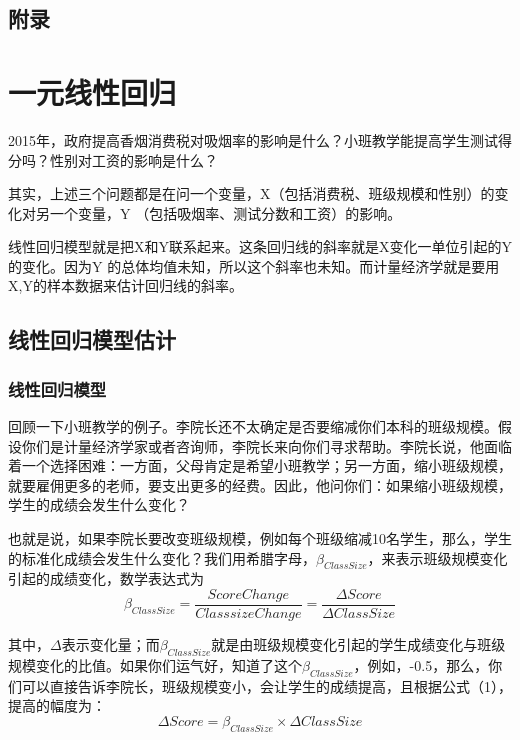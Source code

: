 \documentclass[cn,12pt,math=newtx,citestyle=gb7714-2015,bibstyle=gb7714-2015]{elegantbook}
\begin{document}
	
	
	\section{附录}
	
	
	
	\chapter{一元线性回归}
	
	2015年，政府提高香烟消费税对吸烟率的影响是什么？小班教学能提高学生测试得分吗？性别对工资的影响是什么？
	
	其实，上述三个问题都是在问一个变量，X（包括消费税、班级规模和性别）的变化对另一个变量，Y （包括吸烟率、测试分数和工资）的影响。
	
	线性回归模型就是把X和Y联系起来。这条回归线的斜率就是X变化一单位引起的Y的变化。因为Y 的总体均值未知，所以这个斜率也未知。而计量经济学就是要用X,Y的样本数据来估计回归线的斜率。
	\section{线性回归模型估计}
	\subsection{线性回归模型}
	回顾一下小班教学的例子。李院长还不太确定是否要缩减你们本科的班级规模。假设你们是计量经济学家或者咨询师，李院长来向你们寻求帮助。李院长说，他面临着一个选择困难：一方面，父母肯定是希望小班教学；另一方面，缩小班级规模，就要雇佣更多的老师，要支出更多的经费。因此，他问你们：如果缩小班级规模，学生的成绩会发生什么变化？
	
	也就是说，如果李院长要改变班级规模，例如每个班级缩减10名学生，那么，学生的标准化成绩会发生什么变化？我们用希腊字母，$\beta_{ClassSize}$，来表示班级规模变化引起的成绩变化，数学表达式为
	\begin{equation}
		\beta_{ClassSize}=\frac{Score Change}{Classsize Change}=\frac{\Delta{Score}}{\Delta{ClassSize}}
	\end{equation}
	
	其中，$\Delta$表示变化量；而$\beta_{ClassSize}$就是由班级规模变化引起的学生成绩变化与班级规模变化的比值。如果你们运气好，知道了这个$\beta_{ClassSize}$，例如，-0.5，那么，你们可以直接告诉李院长，班级规模变小，会让学生的成绩提高，且根据公式（1），提高的幅度为：
	\begin{equation}
		\Delta{Score}=\beta_{ClassSize}\times\Delta{ClassSize}
	\end{equation}
	
\end{document}

